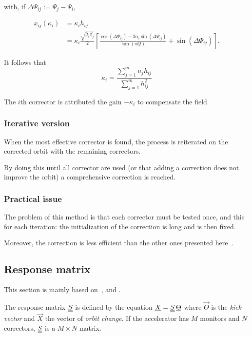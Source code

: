 with, if $\Delta \Psi_{ij} := \Psi_j-\Psi_i$,

\begin{align}
    \label{eq:hij}
    x_{ij}(\kappa_i) &= \kappa_i h_{ij} \nonumber\\
                     &= \kappa_i \frac{\sqrt{\beta_i \beta_j}}{2}
                         \left[
                             \frac{\cos(\Delta \Psi_{ij}) - 2\alpha_i \sin(\Delta\Psi_{ij})}
                                  {\tan (\pi Q)} + \sin (\Delta\Psi_{ij})
                         \right].
\end{align}

It follows that 
\begin{equation}
    \kappa_i = \frac{\sum\limits_{j=1}^m u_j h_{ij}}{\sum\limits_{j=1}^m h_{ij}^2}
\end{equation}

The $i$th corrector is attributed the gain $-\kappa_i$ to compensate the field.

\subsubsection{Iterative version}
When the most effective corrector is found, the process is reiterated on the corrected orbit with the remaining correctors. 

By doing this until all corrector are used (or that adding a correction does not improve the orbit) a comprehensive correction is reached.

\subsubsection{Practical issue}
The problem of this method is that each corrector must be tested once, and this for each iteration: the initialization of the correction is long and is then fixed.

Moreover, the correction is less efficient than the other ones presented here~\cite{book:wille}.

\subsection{Response matrix}
\label{sec:response_matrix}

This section is mainly based on~\cite{book:wille}, \cite{art:decker-1991} and \cite{art:plouviez-1999}.

The response matrix $\underline{\underline{S}}$ is defined by the equation $\underline{X} = \underline{\underline{S}}\, \underline{\Theta}$ where $\vec{\Theta}$ is the \emph{kick vector} and $\vec{X}$ the vector of \emph{orbit change}. If the accelerator has $M$ monitors and $N$ correctors, $\underline{\underline{S}}$ is a $M \times N$ matrix.

